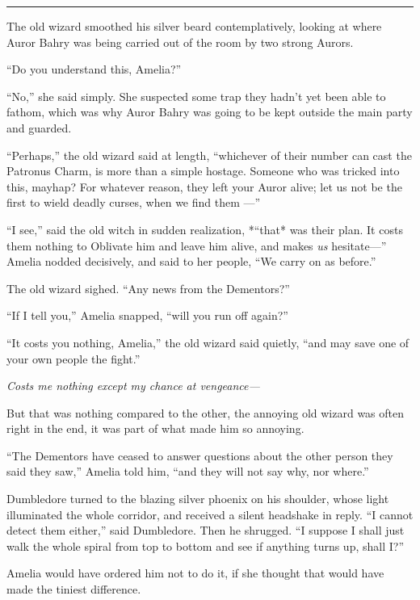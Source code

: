 \begin{center}\rule{3in}{0.4pt}\end{center}

The old wizard smoothed his silver beard contemplatively, looking at
where Auror Bahry was being carried out of the room by two strong
Aurors.

``Do you understand this, Amelia?''

``No,'' she said simply. She suspected some trap they hadn't yet been
able to fathom, which was why Auror Bahry was going to be kept outside
the main party and guarded.

``Perhaps,'' the old wizard said at length, ``whichever of their number
can cast the Patronus Charm, is more than a simple hostage. Someone who
was tricked into this, mayhap? For whatever reason, they left your Auror
alive; let us not be the first to wield deadly curses, when we find them
---''

``I see,'' said the old witch in sudden realization, *``that* was their
plan. It costs them nothing to Oblivate him and leave him alive, and
makes \emph{us} hesitate---'' Amelia nodded decisively, and said to her
people, ``We carry on as before.''

The old wizard sighed. ``Any news from the Dementors?''

``If I tell you,'' Amelia snapped, ``will you run off again?''

``It costs you nothing, Amelia,'' the old wizard said quietly, ``and may
save one of your own people the fight.''

\emph{Costs me nothing except my chance at vengeance---}

But that was nothing compared to the other, the annoying old wizard was
often right in the end, it was part of what made him so annoying.

``The Dementors have ceased to answer questions about the other person
they said they saw,'' Amelia told him, ``and they will not say why, nor
where.''

Dumbledore turned to the blazing silver phoenix on his shoulder, whose
light illuminated the whole corridor, and received a silent headshake in
reply. ``I cannot detect them either,'' said Dumbledore. Then he
shrugged. ``I suppose I shall just walk the whole spiral from top to
bottom and see if anything turns up, shall I?''

Amelia would have ordered him not to do it, if she thought that would
have made the tiniest difference.

